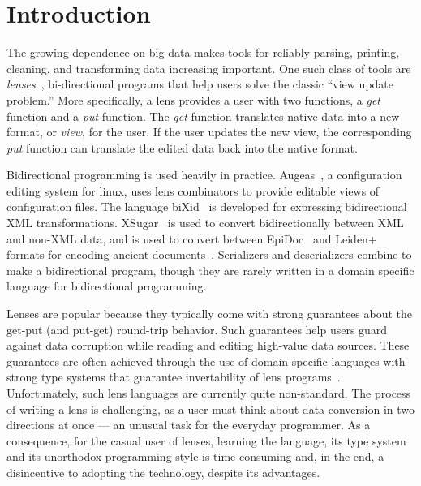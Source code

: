 \documentclass[numbers]{sigplanconf}
\begin{document}
\section{Introduction}

The growing dependence on big data makes tools for reliably parsing,
printing, cleaning, and transforming data increasing important.
One such class of tools are \emph{lenses}~\cite{Focal2005-long}, bi-directional
programs that help users solve the classic ``view update problem.''
More specifically, a lens provides a user with two functions, a
\emph{get} function and a \emph{put} function.  The \emph{get}
function translates native data into a new format, or \emph{view}, for
the user.  If the user updates the new view, the corresponding
\emph{put} function can translate the edited data back into
the native format.

Bidirectional programming is used heavily in practice.
Augeas~\cite{?}, a configuration editing system for linux, uses lens combinators
to provide editable views of configuration files.
The language biXid~\cite{bixid} is developed for expressing bidirectional XML
transformations.
XSugar~\cite{xsugar} is used to convert bidirectionally between XML and non-XML data,
and is used to convert between EpiDoc~\cite{epidoc} and Leiden+~\cite{leidenplus} formats for
encoding ancient documents~\cite{epidocleidenplus}.
Serializers and deserializers combine to make a bidirectional program, though
they are rarely written in a domain specific language for bidirectional
programming.

Lenses are popular because they typically come with strong guarantees
about the get-put (and put-get) round-trip behavior.  Such guarantees
help users guard against data corruption while reading and editing
high-value data sources.  These guarantees are often achieved through
the use of domain-specific languages with strong type systems that
guarantee invertability of lens programs~\cite{Focal2005-long,boomerang,symmetric-lenses}.  Unfortunately, such
lens languages are currently quite non-standard.  The
process of writing a lens is challenging, as a user must think
about data conversion in two directions at once --- an
unusual task for the everyday programmer.  As a consequence, 
for the casual user of lenses, learning the language, its type system and its
unorthodox programming style is time-consuming and, in the end,
a disincentive to adopting the technology, despite its advantages.
\end{document}
